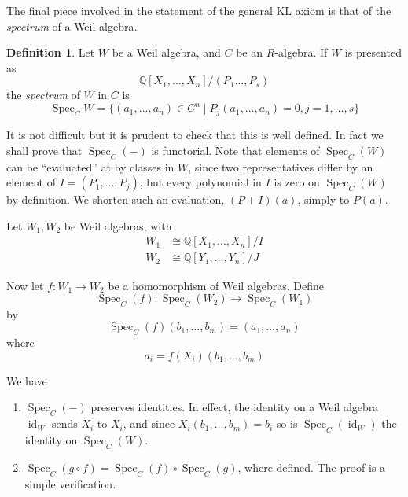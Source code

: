 \documentclass[11pt]{article}
\theoremstyle{definition}
\newtheorem{defn}{Definition}[section]
\newcommand{\farg}{-} %
\newcommand{\Q}{\mathbb{Q}}
\DeclareMathOperator{\spec}{Spec}
\DeclareMathOperator{\id}{id}
\numberwithin{equation}{section}
\begin{document}
The final piece involved in the statement of the general KL axiom is that of the \emph{spectrum} of a Weil algebra.
\begin{defn}
  Let \( W \) be a Weil algebra, and \( C \) be an \( R \)-algebra. If \( W \) is presented as 
  \begin{equation*}
    \Q[X_1,\dots,X_n]/(P_1\dots,P_s)
  \end{equation*}
  the \emph{spectrum} of \( W \) in \( C \) is
  \begin{equation*}
    \spec_C{W} = \{(a_1,\dots,a_n)\in C^n \mid P_j(a_1,\dots,a_n) = 0, j=1,\dots,s\} 
    \label{def:spec}
  \end{equation*}
\end{defn}
It is not difficult but it is prudent to check that this is well defined. In fact we shall prove that \( \spec_C(\farg) \) is functorial. Note that elements of \( \spec_C(W) \) can be ``evaluated'' at by classes in \( W \), since two representatives differ by an element of \( I=(P_1,\dots,P_j) \), but every polynomial in \( I \) is zero on \( \spec_C(W) \) by definition. We shorten such an evaluation, \( (P+I)(a) \), simply to \( P(a) \). 

Let \( W_1, W_2 \) be Weil algebras, with
\begin{align*}
  W_1 &\cong \Q[X_1,\dots,X_n]/I \\
  W_2 &\cong \Q[Y_1,\dots,Y_n]/J
\end{align*}

Now let \( f:W_1\to W_2 \) be a homomorphism of Weil algebras. Define
\begin{equation*}
  \spec_C(f):\spec_C(W_2)\to \spec_C(W_1)
\end{equation*}
by
\begin{equation*}
  \spec_C(f)(b_1,\dots,b_m) = (a_1,\dots,a_n)
\end{equation*}
where
\begin{equation*}
  a_i = f(X_i)(b_1,\dots,b_m)
\end{equation*}

We have
\begin{enumerate}
  \item \(\spec_C(\farg)\) preserves identities.
    In effect, the identity on a Weil algebra \( \id_W \) sends \( X_i \) to \( X_i \), and since \( X_i(b_1,\dots,b_m) = b_i \) so is \( \spec_C(\id_W) \) the identity on \( \spec_C(W) \).
  \item \(\spec_C(g\circ f) = \spec_C(f)\circ \spec_C(g)\), where defined. The proof is a simple verification.
\end{enumerate}
\end{document}
